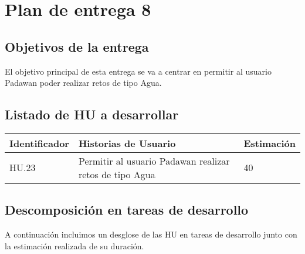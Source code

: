 \section{Plan de entrega 8}

\subsection{Objetivos de la entrega}

El objetivo principal de esta entrega se va a centrar en permitir al usuario Padawan poder realizar retos de tipo Agua.

\subsection{Listado de HU a desarrollar}

\begin{table}[h]
	\centering
	\begin{tabular}{| p{2.3cm} | p{6.7cm} | p{2cm} |}
		\rowcolor[HTML]{329A9D} 
		{\color[HTML]{FFFFFF} \textbf{Identificador}} & {\color[HTML]{FFFFFF} \textbf{Historias de Usuario}} & {\color[HTML]{FFFFFF} \textbf{Estimación}}  \\ \hline
		HU.23 & Permitir al usuario Padawan realizar retos de tipo Agua & 40 \\ \hline
	\end{tabular}
\end{table}

\newpage

\subsection{Descomposición en tareas de desarrollo}

A continuación incluimos un desglose de las HU en tareas de desarrollo junto con la estimación realizada de su duración.\\


